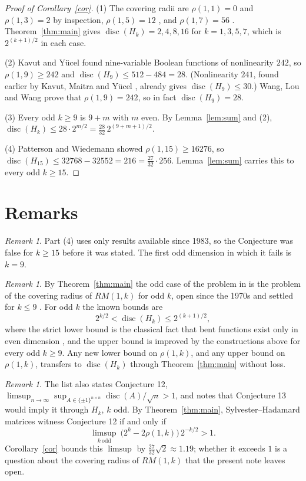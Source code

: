 \documentclass[11pt]{amsart}
\theoremstyle{remark}
\newtheorem{remark}[theorem]{Remark}
\newcommand{\disc}{\operatorname{disc}}
\begin{document}
\begin{proof}[Proof of Corollary~\ref{cor}]
(1) The covering radii are $\rho(1,1)=0$ and $\rho(1,3)=2$ by inspection,
$\rho(1,5)=12$ \cite{BW}, and $\rho(1,7)=56$ \cite{Mykkeltveit}. Theorem~\ref{thm:main}
gives $\disc(H_k)=2,4,8,16$ for $k=1,3,5,7$, which is $2^{(k+1)/2}$ in each case.

(2) Kavut and Y\"ucel \cite{KY} found nine-variable Boolean functions of
nonlinearity $242$, so $\rho(1,9)\ge242$ and
$\disc(H_9)\le 512-484=28$. (Nonlinearity $241$, found earlier by Kavut, Maitra
and Y\"ucel \cite{KMY}, already gives $\disc(H_9)\le30$.) Wang, Lou and Wang
\cite{WLW} prove that $\rho(1,9)=242$, so in fact $\disc(H_9)=28$.

(3) Every odd $k\ge9$ is $9+m$ with $m$ even. By Lemma~\ref{lem:sum} and (2),
$\disc(H_k)\le 28\cdot 2^{m/2}=\tfrac{28}{32}\,2^{(9+m+1)/2}$.

(4) Patterson and Wiedemann \cite{PW} showed $\rho(1,15)\ge16276$, so
$\disc(H_{15})\le 32768-32552=216=\tfrac{27}{32}\cdot 256$. Lemma~\ref{lem:sum}
carries this to every odd $k\ge15$.
\end{proof}

\section{Remarks}

\begin{remark}
Part (4) uses only results available since 1983, so the Conjecture was false for
$k\ge15$ before it was stated. The first odd dimension in which it fails is $k=9$.
\end{remark}

\begin{remark}
By Theorem~\ref{thm:main} the odd case of the problem in \cite{RS101} is the
problem of the covering radius of $RM(1,k)$ for odd $k$, open since the 1970s
\cite{CHLL} and settled for $k\le9$ \cite{BW,Mykkeltveit,WLW}.
For odd $k$ the known bounds are
\[
2^{k/2}<\disc(H_k)\le 2^{(k+1)/2},
\]
where the strict lower bound is the classical fact that bent functions exist only in
even dimension \cite{Rothaus}, and the upper bound is improved by the constructions above for every
odd $k\ge9$. Any new lower bound on $\rho(1,k)$, and any upper bound on
$\rho(1,k)$, transfers to $\disc(H_k)$ through Theorem~\ref{thm:main} without loss.
\end{remark}

\begin{remark}
The list \cite{RS101} also states Conjecture 12,
$\limsup_{n\to\infty}\sup_{A\in\{\pm1\}^{n\times n}}\disc(A)/\sqrt n>1$, and
notes that Conjecture 13 would imply it through $H_k$, $k$ odd. By
Theorem~\ref{thm:main}, Sylvester--Hadamard matrices witness Conjecture 12 if and
only if
\[
\limsup_{k\ \mathrm{odd}}\ \bigl(2^k-2\rho(1,k)\bigr)\,2^{-k/2}>1 .
\]
Corollary~\ref{cor} bounds this $\limsup$ by $\tfrac{27}{32}\sqrt2\approx1.19$; whether it
exceeds $1$ is a question about the covering radius of $RM(1,k)$ that the present
note leaves open.
\end{remark}
\end{document}
